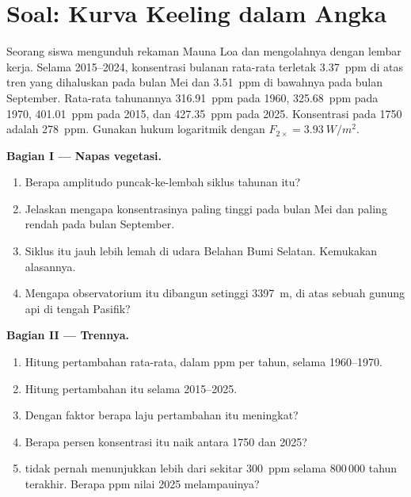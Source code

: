 \section{Soal: Kurva Keeling dalam Angka}

\begin{problem}
\label{pb:g12:climate-change:1}
Seorang siswa mengunduh rekaman Mauna Loa dan mengolahnya dengan lembar kerja.
Selama 2015--2024, konsentrasi bulanan rata-rata terletak \qty{3.37}{ppm} di
atas tren yang dihaluskan pada bulan Mei dan \qty{3.51}{ppm} di bawahnya pada
bulan September. Rata-rata tahunannya \qty{316.91}{ppm} pada 1960,
\qty{325.68}{ppm} pada 1970, \qty{401.01}{ppm} pada 2015, dan \qty{427.35}{ppm}
pada 2025. Konsentrasi pada 1750 adalah \qty{278}{ppm}. Gunakan hukum
logaritmik dengan $F_{2\times} = \qty{3.93}{W/m^2}$.

\medskip
\noindent\textbf{Bagian I --- Napas vegetasi.}
\begin{enumerate}
  \item Berapa amplitudo puncak-ke-lembah siklus tahunan itu?
  \item Jelaskan mengapa konsentrasinya paling tinggi pada bulan Mei dan paling
        rendah pada bulan September.
  \item Siklus itu jauh lebih lemah di udara Belahan Bumi Selatan. Kemukakan
        alasannya.
  \item Mengapa observatorium itu dibangun setinggi \qty{3397}{m}, di atas
        sebuah gunung api di tengah Pasifik?
\end{enumerate}

\medskip
\noindent\textbf{Bagian II --- Trennya.}
\begin{enumerate}[resume]
  \item Hitung pertambahan rata-rata, dalam ppm per tahun, selama 1960--1970.
  \item Hitung pertambahan itu selama 2015--2025.
  \item Dengan faktor berapa laju pertambahan itu meningkat?
  \item Berapa persen konsentrasi itu naik antara 1750 dan 2025?
  \item {} tidak pernah menunjukkan lebih dari sekitar \qty{300}{ppm}
        selama 800\,000 tahun terakhir. Berapa ppm nilai 2025 melampauinya?
\end{enumerate}


\end{problem}
